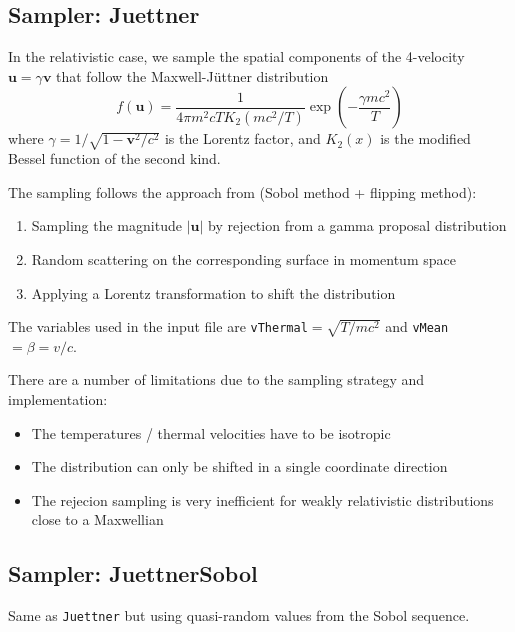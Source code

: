 \documentclass[11pt]{article}
\begin{document}
\subsection{Sampler: Juettner}\label{sec:JuettnerSampler}
In the relativistic case, we sample the spatial components of the 4-velocity $\mathbf{u} = \gamma \mathbf{v}$ that follow the Maxwell-Jüttner distribution
$$ f(\mathbf{u}) = \frac{1}{4\pi m^2 c T K_2(mc^2/T)} \exp\left(- \frac{\gamma m c^2}{T}\right)$$
where $\gamma = 1 / \sqrt{1 - \mathbf{v}^2 / c^2}$ is the Lorentz factor, and $K_2(x)$ is the modified Bessel function of the second kind.

The sampling follows the approach from \cite{zenitani2015} (Sobol method + flipping method):
\begin{enumerate}
    \item Sampling the magnitude $|\mathbf{u}|$ by rejection from a gamma proposal distribution
    \item Random scattering on the corresponding surface in momentum space
    \item Applying a Lorentz transformation to shift the distribution
\end{enumerate}

The variables used in the input file are \verb|vThermal|$= \sqrt{T / mc^2}$ and \verb|vMean|$= \beta = v/c$.

\begin{note}
    There are a number of limitations due to the sampling strategy and implementation:
    \begin{itemize}
        \item The temperatures / thermal velocities have to be isotropic
        \item The distribution can only be shifted in a single coordinate direction
        \item The rejecion sampling is very inefficient for weakly relativistic distributions close to a Maxwellian
    \end{itemize}
\end{note}

\subsection{Sampler: JuettnerSobol}
Same as \verb|Juettner| but using quasi-random values from the Sobol sequence.
\end{document}
